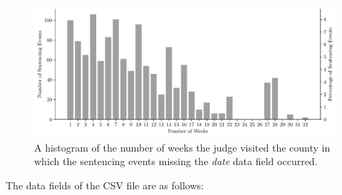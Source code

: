 \documentclass[11pt, oneside]{article}   	%
\theoremstyle{ModifiedStyle}
\begin{document}
	\begin{figure}[H]
		\centering
		\includegraphics[scale=0.75]{Figures/Missing_Date_Histogram_of_Potential_Week_Histogram}
		\vspace{-2mm}
		\caption{A histogram of the number of weeks the judge visited the county in which the sentencing events missing the \emph{date} data field occurred.}
		\label{Figure_Missing_Date_Histogram_of_Potential_Week_Histogram}
	\end{figure}

	\noindent The data fields of the CSV file are as follows:
\end{document}
